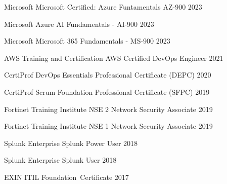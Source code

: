 

\begin{cvhonors}

  \cvhonor
    {Microsoft} %
    {Microsoft Certified: Azure Funtamentals AZ-900} %
    {} %
    {2023} %

  \cvhonor
    {Microsoft} %
    {Azure AI Fundamentals - AI-900} %
    {} %
    {2023} %

  \cvhonor
    {Microsoft} %
    {Microsoft 365 Fundamentals - MS-900} %
    {} %
    {2023} %

  \cvhonor
    {AWS Training and Certification} %
    {AWS Certified DevOps Engineer} %
    {} %
    {2021} %

  \cvhonor
    {CertiProf} %
    {DevOps Essentials Professional Certificate (DEPC)} %
    {} %
    {2020} %

  \cvhonor
    {CertiProf} %
    {Scrum Foundation Professional Certificate (SFPC)} %
    {} %
    {2019} %

  \cvhonor
    {Fortinet Training Institute} %
    {NSE 2 Network Security Associate} %
    {} %
    {2019} %

  \cvhonor
    {Fortinet Training Institute} %
    {NSE 1 Network Security Associate} %
    {} %
    {2019} %

  \cvhonor
    {Splunk Enterprise} %
    {Splunk Power User} %
    {} %
    {2018} %

  \cvhonor
    {Splunk Enterprise} %
    {Splunk User} %
    {} %
    {2018} %

  \cvhonor
    {EXIN} %
    {ITIL Foundation Certificate} %
    {} %
    {2017} %

\end{cvhonors}
